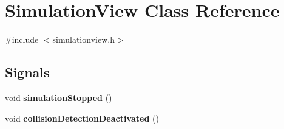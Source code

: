 \section{\-Simulation\-View \-Class \-Reference}
\label{d9/df6/classSimulationView}


{\ttfamily \#include $<$simulationview.\-h$>$}

\subsection*{\-Signals}
\begin{DoxyCompactItemize}
\item 
void {\bfseries simulation\-Stopped} ()\label{d9/df6/classSimulationView_a4198d47f7517525c5702a9bc6e1e9369}

\item 
void {\bfseries collision\-Detection\-Deactivated} ()\label{d9/df6/classSimulationView_ac6d069baef5c77cff2b8ada065950ab4}

\end{DoxyCompactItemize}
